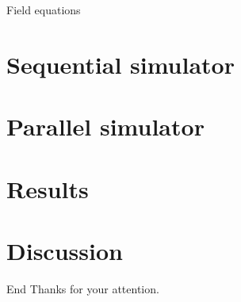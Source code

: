 \documentclass{beamer}
\begin{document}
\begin{frame}{Field equations}{}
\end{frame}

\section{Sequential simulator}
\section{Parallel simulator}
\section{Results}
\section{Discussion}

\begin{frame}{End}
Thanks for your attention.
\end{frame}
\end{document}
